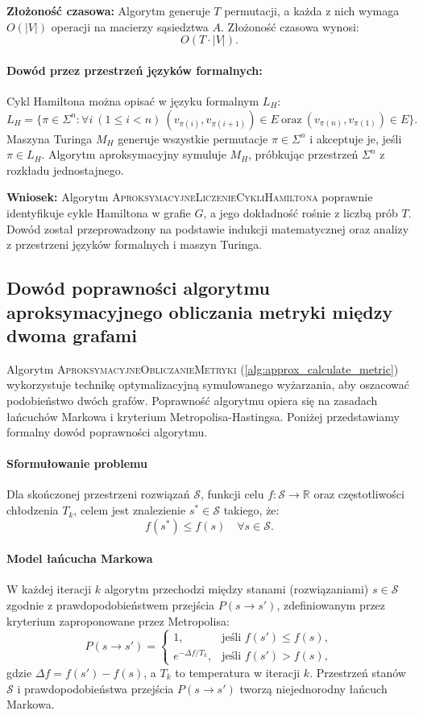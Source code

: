 \textbf{Złożoność czasowa:}  
Algorytm generuje \( T \) permutacji, a każda z nich wymaga \( O(|V|) \) operacji na macierzy sąsiedztwa \( A \). Złożoność czasowa wynosi:
\[
O(T \cdot |V|).
\]

\paragraph{Dowód przez przestrzeń języków formalnych:}
Cykl Hamiltona można opisać w języku formalnym \( L_H \):
\[
L_H = \{\pi \in \Sigma^n : \forall i \ (1 \leq i < n) \ (v_{\pi(i)}, v_{\pi(i+1)}) \in E \ \text{oraz} \ (v_{\pi(n)}, v_{\pi(1)}) \in E\}.
\]
Maszyna Turinga \( M_H \) generuje wszystkie permutacje \( \pi \in \Sigma^n \) i akceptuje je, jeśli \( \pi \in L_H \). Algorytm aproksymacyjny symuluje \( M_H \), próbkując przestrzeń \( \Sigma^n \) z rozkładu jednostajnego.

\textbf{Wniosek:}  
Algorytm \textsc{AproksymacyjneLiczenieCykliHamiltona} poprawnie identyfikuje cykle Hamiltona w grafie \( G \), a jego dokładność rośnie z liczbą prób \( T \). Dowód został przeprowadzony na podstawie indukcji matematycznej oraz analizy z przestrzeni języków formalnych i maszyn Turinga.

\subsection{Dowód poprawności algorytmu aproksymacyjnego obliczania metryki między dwoma grafami}

Algorytm \textsc{AproksymacyjneObliczanieMetryki} (\ref{alg:approx_calculate_metric}) wykorzystuje technikę optymalizacyjną symulowanego wyżarzania, aby oszacować podobieństwo dwóch grafów. Poprawność algorytmu opiera się na zasadach łańcuchów Markowa i kryterium Metropolisa-Hastingsa. Poniżej przedstawiamy formalny dowód poprawności algorytmu.

\paragraph{Sformułowanie problemu}
Dla skończonej przestrzeni rozwiązań $\mathcal{S}$, funkcji celu $f : \mathcal{S} \to \mathbb{R}$ oraz częstotliwości chłodzenia $T_k$, celem jest znalezienie $s^* \in \mathcal{S}$ takiego, że:
\[
    f(s^*) \leq f(s) \quad \forall s \in \mathcal{S}.
\]

\paragraph{Model łańcucha Markowa}
W każdej iteracji $k$ algorytm przechodzi między stanami (rozwiązaniami) $s \in \mathcal{S}$ zgodnie z prawdopodobieństwem przejścia $P(s \to s')$, zdefiniowanym przez kryterium zaproponowane przez Metropolisa:
\[
    P(s \to s') = \begin{cases}
                      1, & \text{jeśli } f(s') \leq f(s), \\
                      e^{-\Delta f / T_k}, & \text{jeśli } f(s') > f(s),
    \end{cases}
\]
gdzie $\Delta f = f(s') - f(s)$, a $T_k$ to temperatura w iteracji $k$. Przestrzeń stanów $\mathcal{S}$ i prawdopodobieństwa przejścia $P(s \to s')$ tworzą niejednorodny łańcuch Markowa.

